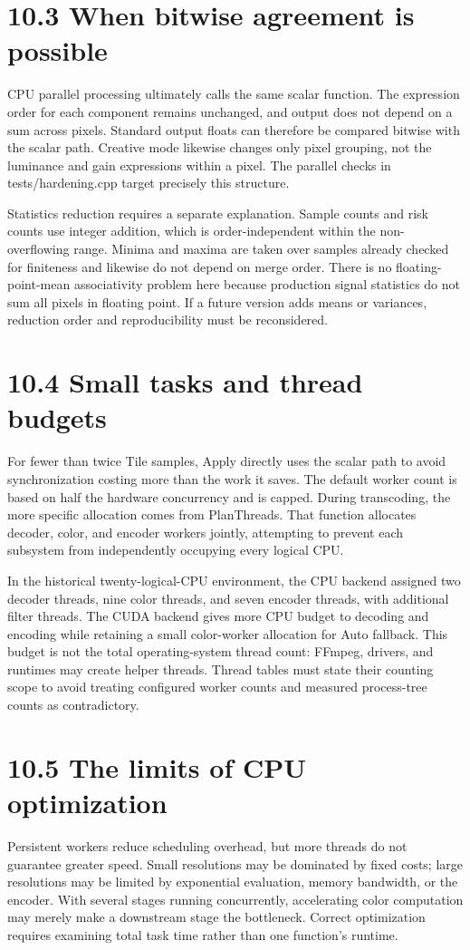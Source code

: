 \documentclass[11pt,a4paper,openany]{book}
\begin{document}
\section*{10.3 When bitwise agreement is possible}
CPU parallel processing ultimately calls the same scalar function. The expression order for each component remains unchanged, and output does not depend on a sum across pixels. Standard output floats can therefore be compared bitwise with the scalar path. Creative mode likewise changes only pixel grouping, not the luminance and gain expressions within a pixel. The parallel checks in tests/hardening.cpp target precisely this structure.

Statistics reduction requires a separate explanation. Sample counts and risk counts use integer addition, which is order-independent within the non-overflowing range. Minima and maxima are taken over samples already checked for finiteness and likewise do not depend on merge order. There is no floating-point-mean associativity problem here because production signal statistics do not sum all pixels in floating point. If a future version adds means or variances, reduction order and reproducibility must be reconsidered.


\section*{10.4 Small tasks and thread budgets}
For fewer than twice Tile samples, Apply directly uses the scalar path to avoid synchronization costing more than the work it saves. The default worker count is based on half the hardware concurrency and is capped. During transcoding, the more specific allocation comes from PlanThreads. That function allocates decoder, color, and encoder workers jointly, attempting to prevent each subsystem from independently occupying every logical CPU.

In the historical twenty-logical-CPU environment, the CPU backend assigned two decoder threads, nine color threads, and seven encoder threads, with additional filter threads. The CUDA backend gives more CPU budget to decoding and encoding while retaining a small color-worker allocation for Auto fallback. This budget is not the total operating-system thread count: FFmpeg, drivers, and runtimes may create helper threads. Thread tables must state their counting scope to avoid treating configured worker counts and measured process-tree counts as contradictory.


\section*{10.5 The limits of CPU optimization}
Persistent workers reduce scheduling overhead, but more threads do not guarantee greater speed. Small resolutions may be dominated by fixed costs; large resolutions may be limited by exponential evaluation, memory bandwidth, or the encoder. With several stages running concurrently, accelerating color computation may merely make a downstream stage the bottleneck. Correct optimization requires examining total task time rather than one function's runtime.
\end{document}
